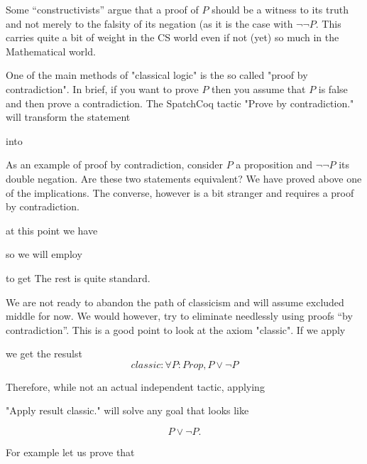 Some ``constructivists'' argue that a proof of $P$ should be a witness to its truth and not merely to the falsity of its negation (as it is the case with $\neg \neg P$. This carries quite a bit of weight in the CS world even if not (yet) so much in the Mathematical world.

One of the main methods of "classical logic" is the so called "proof by contradiction". In brief, if you want to prove $P$ then you assume that $P$ is false and then prove a contradiction. The SpatchCoq tactic 
"Prove by contradiction." will transform the statement


into 


As an example of proof by contradiction, consider $P$ a proposition and $\neg \neg P$ its double negation. Are these two statements equivalent? We have proved above one of the implications. The converse, however is a bit stranger and requires a proof by contradiction.



at this point we have 


so we will employ 

to get
 The rest is quite standard.

We are not ready to abandon the path of classicism and will assume excluded middle for now. We would however, try to eliminate needlessly using proofs ``by contradiction''.
This is a good point to look at the axiom "classic". If we apply

we get the resulst $$classic
    : \forall  P : Prop, P \lor \neg P$$


Therefore, while not an actual independent tactic, applying

"Apply result classic."
will solve any goal that looks like

$$P \lor \neg P.$$

For example let us prove that 

